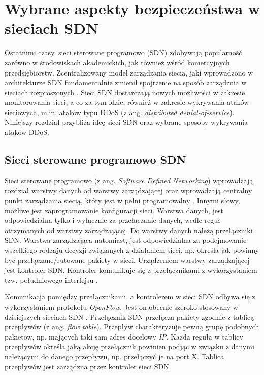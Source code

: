 \chapter{Wybrane aspekty bezpieczeństwa w sieciach SDN }

Ostatnimi czasy, sieci sterowane programowo (SDN) zdobywają popularność zarówno
w środowiskach akademickich, jak również wśród komercyjnych przedsiębiorstw.
Zcentralizowany model zarządzania siecią, jaki wprowadzono w architekturze SDN
fundamentalnie zmienił spojrzenie na sposób zarządznia w sieciach rozproszonych
\cite{ddosNYarticle}. Sieci SDN dostarczają nowych możliwości w zakresie
monitorowania sieci, a co za tym idzie, również w zakresie wykrywania ataków
sieciowych, m.in. ataków typu DDoS (z ang. \textit{distributed
  denial-of-service}). Niniejszy rozdział przybliża ideę sieci SDN oraz wybrane
sposoby wykrywania ataków DDoS. 

\section{Sieci sterowane programowo SDN}
Sieci sterowane programowo (z ang. \textit{Software Defined Networking})
wprowadzają rozdział warstwy danych od warstwy zarządzającej oraz wprowadzają
centralny punkt zarządzania siecią, który jest w pełni programowalny \cite{onf}.
Innymi słowy, możliwe jest zaprogramowanie konfiguracji sieci. Warstwa danych,
jest odpowiedzialna tylko i wyłącznie za przełączanie danych, wedle reguł
otrzymanych od warstwy zarządzającej. Do warstwy danych należą przełączniki SDN.
Warstwa zarządzająca natomiast, jest odpowiedzialna za podejmowanie wszelkiego
rodzaju decyzji związanych z działaniem sieci, np. określa jak powinny być
przełączane/rutowane pakiety w sieci. Urządzeniem warstwy zarządzającej jest
kontroler SDN. Kontroler komunikuje się z przełącznikami z wykorzystaniem tzw.
południowego interfejsu \cite{sdninterfaces}.

Komunikacja pomiędzy przełącznikami, a kontrolerem w sieci SDN odbywa się z
wykorzystaniem protokołu \textit{OpenFlow}. Jest on obecnie szeroko stosowany w
dzisiejszych sieciach SDN \cite{ddoskoreaarticle}. Przełącznik SDN przełącza
pakiety zgodnie z tablicą przepływów (z ang. \textit{flow table}). Przepływ
charakteryzuje pewną grupę podobnych pakietów, np. mających taki sam adres
docelowy \textit{IP}. Każda reguła w tablicy przepływów określa jaką akcję
przełącznik powinien podjąc w związku z danymi należącymi do danego
przepływu, np. przełączyć je na port X. Tablica przepływów jest zarządzna przez
kontroler sieci SDN.

